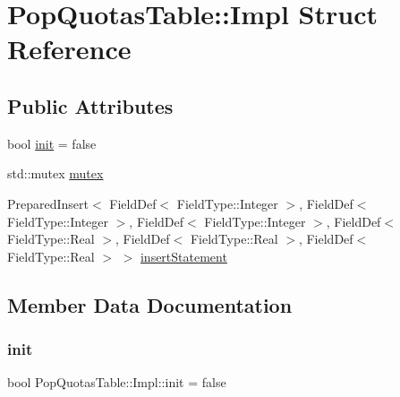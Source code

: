 \hypertarget{struct_pop_quotas_table_1_1_impl}{}\section{Pop\+Quotas\+Table\+::Impl Struct Reference}
\label{struct_pop_quotas_table_1_1_impl}
\subsection*{Public Attributes}
\begin{DoxyCompactItemize}
\item 
bool \mbox{\hyperlink{struct_pop_quotas_table_1_1_impl_a442e90ed68ff7e7b2b5d04d3d3024281}{init}} = false
\item 
std\+::mutex \mbox{\hyperlink{struct_pop_quotas_table_1_1_impl_ac4b1ba51f41c8df65eaac929e1018879}{mutex}}
\item 
Prepared\+Insert$<$ Field\+Def$<$ Field\+Type\+::\+Integer $>$, Field\+Def$<$ Field\+Type\+::\+Integer $>$, Field\+Def$<$ Field\+Type\+::\+Integer $>$, Field\+Def$<$ Field\+Type\+::\+Real $>$, Field\+Def$<$ Field\+Type\+::\+Real $>$, Field\+Def$<$ Field\+Type\+::\+Real $>$ $>$ \mbox{\hyperlink{struct_pop_quotas_table_1_1_impl_acc2984e3b90f536af5f06ff278631d08}{insert\+Statement}}
\end{DoxyCompactItemize}


\subsection{Member Data Documentation}
\mbox{\label{struct_pop_quotas_table_1_1_impl_a442e90ed68ff7e7b2b5d04d3d3024281}} 
\subsubsection{\texorpdfstring{init}{init}}
{\footnotesize\ttfamily bool Pop\+Quotas\+Table\+::\+Impl\+::init = false}

\mbox{\label{struct_pop_quotas_table_1_1_impl_acc2984e3b90f536af5f06ff278631d08}} 
